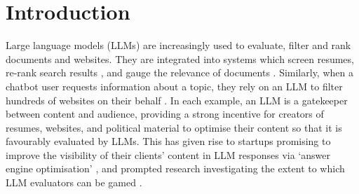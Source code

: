 \documentclass{article}
\begin{document}



















\section{Introduction}
\label{sec:intro}

Large language models (LLMs) are increasingly used to evaluate, filter and rank documents and websites. They are integrated into systems which screen resumes, re-rank search results \citep{sunChatGPTGoodSearch2023}, and gauge the relevance of documents \citep{lewisRetrievalAugmentedGenerationKnowledgeIntensive2020}. Similarly, when a chatbot user requests information about a topic, they rely on an LLM to filter hundreds of websites on their behalf \citep{chatterjiHowPeopleUse2025}. In each example, an LLM is a gatekeeper between content and audience, providing a strong incentive for creators of resumes, websites, and political material to optimise their content so that it is favourably evaluated by LLMs. This has given rise to startups promising to improve the visibility of their clients' content in LLM responses via `answer engine optimisation' \citep{coffeeBillionDollarQuestionHangs2025, aggarwalGEOGenerativeEngine2024a}, and prompted research investigating the extent to which LLM evaluators can be gamed \citep{liLLMsCannotReliably2025}.
\end{document}

